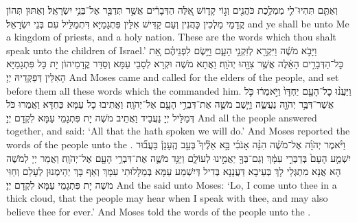 {וְאַתֶּ֧ם תִּהְיוּ־לִ֛י מַמְלֶ֥כֶת כֹּהֲנִ֖ים וְג֣וֹי קָד֑וֹשׁ אֵ֚לֶּה הַדְּבָרִ֔ים אֲשֶׁ֥ר תְּדַבֵּ֖ר אֶל־בְּנֵ֥י יִשְׂרָאֵֽל׃
}
{וְאַתּוּן תְּהוֹן קֳדָמַי מַלְכִין כָּהֲנִין וְעַם קַדִּישׁ אִלֵּין פִּתְגָמַיָּא דִּתְמַלֵּיל עִם בְּנֵי יִשְׂרָאֵל׃}
{and ye shall be unto Me a kingdom of priests, and a holy nation. These are the words which thou shalt speak unto the children of Israel.’}{}
{וַיָּבֹ֣א מֹשֶׁ֔ה וַיִּקְרָ֖א לְזִקְנֵ֣י הָעָ֑ם וַיָּ֣שֶׂם לִפְנֵיהֶ֗ם אֵ֚ת כׇּל־הַדְּבָרִ֣ים הָאֵ֔לֶּה אֲשֶׁ֥ר צִוָּ֖הוּ יְהֹוָֽה׃}
{וַאֲתָא מֹשֶׁה וּקְרָא לְסָבֵי עַמָּא וְסַדַּר קֳדָמֵיהוֹן יָת כָּל פִּתְגָמַיָּא הָאִלֵּין דְּפַקְּדֵיהּ יְיָ׃}
{And Moses came and called for the elders of the people, and set before them all these words which the \lord\space commanded him.}{}
{וַיַּעֲנ֨וּ כׇל־הָעָ֤ם יַחְדָּו֙ וַיֹּ֣אמְר֔וּ כֹּ֛ל אֲשֶׁר־דִּבֶּ֥ר יְהֹוָ֖ה נַעֲשֶׂ֑ה וַיָּ֧שֶׁב מֹשֶׁ֛ה אֶת־דִּבְרֵ֥י הָעָ֖ם אֶל־יְהֹוָֽה׃
}
{וַאֲתִיבוּ כָל עַמָּא כַּחְדָּא וַאֲמַרוּ כֹּל דְּמַלֵּיל יְיָ נַעֲבֵיד וַאֲתֵיב מֹשֶׁה יָת פִּתְגָמֵי עַמָּא לִקְדָם יְיָ׃}
{And all the people answered together, and said: ‘All that the \lord\space hath spoken we will do.’ And Moses reported the words of the people unto the \lord.}{}
{וַיֹּ֨אמֶר יְהֹוָ֜ה אֶל־מֹשֶׁ֗ה הִנֵּ֨ה אָנֹכִ֜י בָּ֣א אֵלֶ֘יךָ֮ בְּעַ֣ב הֶֽעָנָן֒ בַּעֲב֞וּר יִשְׁמַ֤ע הָעָם֙ בְּדַבְּרִ֣י עִמָּ֔ךְ וְגַם־בְּךָ֖ יַאֲמִ֣ינוּ לְעוֹלָ֑ם וַיַּגֵּ֥ד מֹשֶׁ֛ה אֶת־דִּבְרֵ֥י הָעָ֖ם אֶל־יְהֹוָֽה׃
}
{וַאֲמַר יְיָ לְמֹשֶׁה הָא אֲנָא מִתְגְּלֵי לָךְ בְּעֵיבָא דַּעֲנָנָא בְּדִיל דְּיִשְׁמַע עַמָּא בְּמַלָּלוּתִי עִמָּךְ וְאַף בָּךְ יְהֵימְנוּן לְעָלַם וְחַוִּי מֹשֶׁה יָת פִּתְגָמֵי עַמָּא לִקְדָם יְיָ׃}
{And the \lord\space said unto Moses: ‘Lo, I come unto thee in a thick cloud, that the people may hear when I speak with thee, and may also believe thee for ever.’ And Moses told the words of the people unto the \lord.}{}
